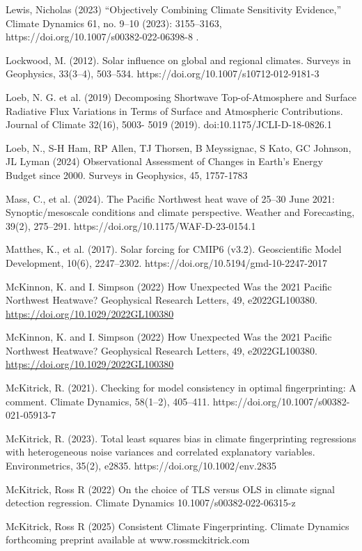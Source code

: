 \documentclass[12pt,paper=a4,DIV=12,parskip=never,chapterprefix=false,headings=standardclasses]{scrreprt}
\begin{document}
Lewis, Nicholas (2023) “Objectively Combining Climate Sensitivity Evidence,” Climate Dynamics 61,
no. 9–10 (2023): 3155–3163, https://doi.org/10.1007/s00382-022-06398-8 .

Lockwood, M. (2012). Solar influence on global and regional climates. Surveys in Geophysics, 33(3–4),
503–534. https://doi.org/10.1007/s10712-012-9181-3

Loeb, N. G. et al. (2019) Decomposing Shortwave Top-of-Atmosphere and Surface Radiative Flux
Variations in Terms of Surface and Atmospheric Contributions. Journal of Climate 32(16), 5003-
5019 (2019). doi:10.1175/JCLI-D-18-0826.1

Loeb, N., S-H Ham, RP Allen, TJ Thorsen, B Meyssignac, S Kato, GC Johnson, JL Lyman (2024)
Observational Assessment of Changes in Earth’s Energy Budget since 2000. Surveys in Geophysics,
45, 1757-1783

Mass, C., et al. (2024). The Pacific Northwest heat wave of 25–30 June 2021: Synoptic/mesoscale
conditions and climate perspective. Weather and Forecasting, 39(2), 275–291.
https://doi.org/10.1175/WAF-D-23-0154.1

Matthes, K., et al. (2017). Solar forcing for CMIP6 (v3.2). Geoscientific Model Development, 10(6),
2247–2302. https://doi.org/10.5194/gmd-10-2247-2017

McKinnon, K. and I. Simpson (2022) How Unexpected Was the 2021 Pacific Northwest Heatwave?
Geophysical Research Letters, 49, e2022GL100380. \url{https://doi.org/10.1029/2022GL100380}

McKinnon, K. and I. Simpson (2022) How Unexpected Was the 2021 Pacific Northwest Heatwave?
Geophysical Research Letters, 49, e2022GL100380. \url{https://doi.org/10.1029/2022GL100380}

McKitrick, R. (2021). Checking for model consistency in optimal fingerprinting: A comment. Climate
Dynamics, 58(1–2), 405–411. https://doi.org/10.1007/s00382-021-05913-7

McKitrick, R. (2023). Total least squares bias in climate fingerprinting regressions with heterogeneous
noise variances and correlated explanatory variables. Environmetrics, 35(2), e2835.
https://doi.org/10.1002/env.2835

McKitrick, Ross R (2022) On the choice of TLS versus OLS in climate signal detection
regression. Climate Dynamics 10.1007/s00382-022-06315-z

McKitrick, Ross R (2025) Consistent Climate Fingerprinting. Climate Dynamics forthcoming preprint
available at www.rossmckitrick.com
\end{document}

